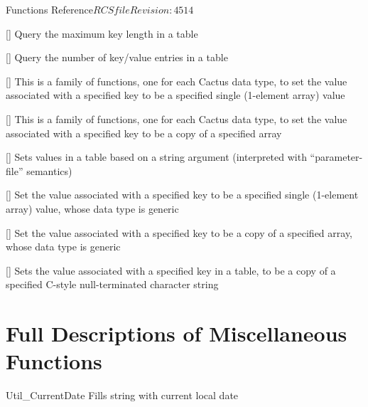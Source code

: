 \begin{cactuspart}{ Functions Reference}{$RCSfile$}{$Revision: 4514 $}
\begin{Lentry}
\item[\code{Util\_TableQueryMaxKeyLength}]
     [\pageref{Util-TableQueryMaxKeyLength}]
Query the maximum key length in a table

\item[\code{Util\_TableQueryNKeys}]
     [\pageref{Util-TableQueryNKeys}]
Query the number of key/value entries in a table

\item[\code{Util\_TableSet*}]
     [\pageref{Util-TableSet*}]
This is a family of functions, one for each Cactus data type,
to set the value associated with a specified key to be a specified
single (1-element array) value

\item[\code{Util\_TableSet*Array}]
     [\pageref{Util-TableSet*Array}]
This is a family of functions, one for each Cactus data type,
to set the value associated with a specified key to be a copy
of a specified array

\item[\code{Util\_TableSetFromString}]
     [\pageref{Util-TableSetFromString}]
Sets values in a table based on a string argument (interpreted with
``parameter-file'' semantics)

\item[\code{Util\_TableSetGeneric}]
     [\pageref{Util-TableSetGeneric}]
Set the value associated with a specified key to be a specified
single (1-element array) value, whose data type is generic

\item[\code{Util\_TableSetGenericArray}]
     [\pageref{Util-TableSetGenericArray}]
Set the value associated with a specified key to be a copy of a
specified array, whose data type is generic

\item[\code{Util\_TableSetString}]
     [\pageref{Util-TableSetString}]
Sets the value associated with a specified key in a table, to be
a copy of a specified C-style null-terminated character string

\end{Lentry}


\chapter{Full Descriptions of Miscellaneous Functions}

\begin{FunctionDescription}{Util\_CurrentDate}
\label{Util-CurrentDate}
Fills string with current local date


\end{FunctionDescription}
\end{cactuspart}
